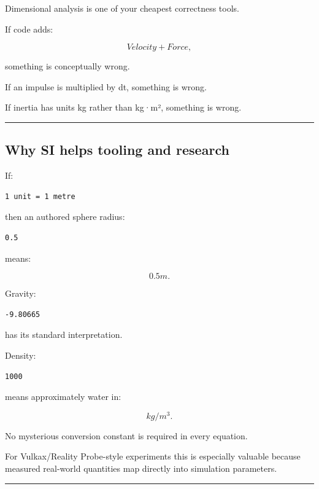 Dimensional analysis is one of your cheapest correctness tools.

If code adds:

\[
Velocity+Force,
\]

something is conceptually wrong.

If an impulse is multiplied by dt, something is wrong.

If inertia has units kg rather than kg·m², something is wrong.

\begin{center}\rule{0.5\linewidth}{0.5pt}\end{center}

\subsection{Why SI helps tooling and research}\label{06-engine-ii-ch039-why-si-helps-tooling-and-research}

If:

\begin{verbatim}
1 unit = 1 metre
\end{verbatim}

then an authored sphere radius:

\begin{verbatim}
0.5
\end{verbatim}

means:

\[
0.5m.
\]

Gravity:

\begin{verbatim}
-9.80665
\end{verbatim}

has its standard interpretation.

Density:

\begin{verbatim}
1000
\end{verbatim}

means approximately water in:

\[
kg/m^3.
\]

No mysterious conversion constant is required in every equation.

For Vulkax/Reality Probe-style experiments this is especially valuable because measured real-world quantities map directly into simulation parameters.

\begin{center}\rule{0.5\linewidth}{0.5pt}\end{center}


